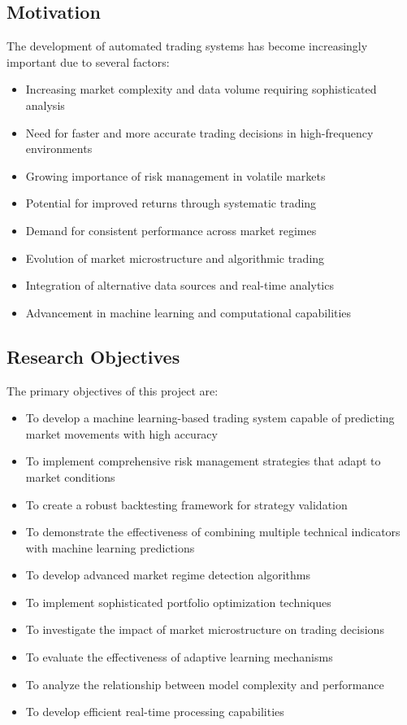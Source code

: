 \documentclass[conference]{IEEEtran}
\begin{document}
\subsection{Motivation}
The development of automated trading systems has become increasingly important due to several factors:
\begin{itemize}
    \item Increasing market complexity and data volume requiring sophisticated analysis
    \item Need for faster and more accurate trading decisions in high-frequency environments
    \item Growing importance of risk management in volatile markets
    \item Potential for improved returns through systematic trading
    \item Demand for consistent performance across market regimes
    \item Evolution of market microstructure and algorithmic trading
    \item Integration of alternative data sources and real-time analytics
    \item Advancement in machine learning and computational capabilities
\end{itemize}

\subsection{Research Objectives}
The primary objectives of this project are:
\begin{itemize}
    \item To develop a machine learning-based trading system capable of predicting market movements with high accuracy
    \item To implement comprehensive risk management strategies that adapt to market conditions
    \item To create a robust backtesting framework for strategy validation
    \item To demonstrate the effectiveness of combining multiple technical indicators with machine learning predictions
    \item To develop advanced market regime detection algorithms
    \item To implement sophisticated portfolio optimization techniques
    \item To investigate the impact of market microstructure on trading decisions
    \item To evaluate the effectiveness of adaptive learning mechanisms
    \item To analyze the relationship between model complexity and performance
    \item To develop efficient real-time processing capabilities
\end{itemize}
\end{document}
